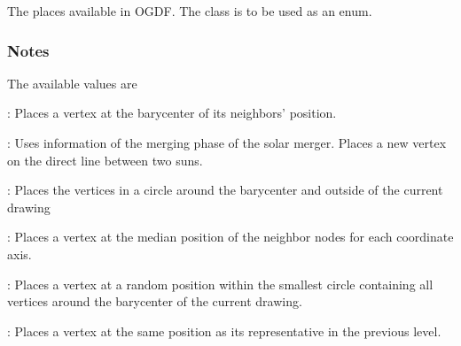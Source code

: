 \documentclass[letterpaper,10pt,english]{sphinxmanual}
\begin{document}
\begin{fulllineitems}
\label{\detokenize{documentation:tmap.Placer}}
The places available in OGDF. The class is to be used as an enum.
\subsubsection*{Notes}

The available values are

: Places a vertex at the barycenter of its neighbors’ position.

: Uses information of the merging phase of the solar merger. Places a new vertex on the direct line between two suns.

: Places the vertices in a circle around the barycenter and outside of the current drawing

: Places a vertex at the median position of the neighbor nodes for each coordinate axis.

: Places a vertex at a random position within the smallest circle containing all vertices around the barycenter of the current drawing.

: Places a vertex at the same position as its representative in the previous level.

\end{fulllineitems}

\end{document}
